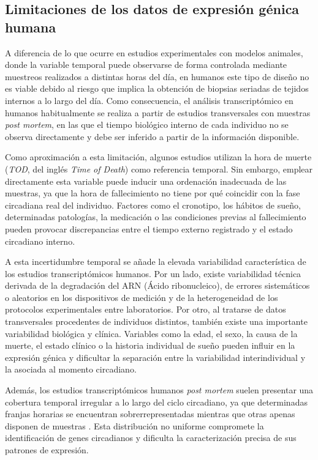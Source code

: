 \documentclass[12pt, a4paper]{report}
\begin{document}
\subsection{Limitaciones de los datos de expresión génica humana}

A diferencia de lo que ocurre en estudios experimentales con modelos animales, donde la variable temporal puede observarse de forma controlada mediante muestreos realizados a distintas horas del día, en humanos este tipo de diseño no es viable debido al riesgo que implica la obtención de biopsias seriadas de tejidos internos a lo largo del día. Como consecuencia, el análisis transcriptómico en humanos habitualmente se realiza a partir de estudios transversales con muestras \textit{post mortem}, en las que el tiempo biológico interno de cada individuo no se observa directamente y debe ser inferido a partir de la información disponible.

Como aproximación a esta limitación, algunos estudios utilizan la hora de muerte (\textit{TOD}, del inglés \textit{Time of Death}) como referencia temporal. Sin embargo, emplear directamente esta variable puede inducir una ordenación inadecuada de las muestras, ya que la hora de fallecimiento no tiene por qué coincidir con la fase circadiana real del individuo. Factores como el cronotipo, los hábitos de sueño, determinadas patologías, la medicación o las condiciones previas al fallecimiento pueden provocar discrepancias entre el tiempo externo registrado y el estado circadiano interno.

A esta incertidumbre temporal se añade la elevada variabilidad característica de los estudios transcriptómicos humanos. Por un lado, existe variabilidad técnica derivada de la degradación del ARN (Ácido ribonucleico), de errores sistemáticos o aleatorios en los dispositivos de medición y de la heterogeneidad de los protocolos experimentales entre laboratorios. Por otro, al tratarse de datos transversales procedentes de individuos distintos, también existe una importante variabilidad biológica y clínica. Variables como la edad, el sexo, la causa de la muerte, el estado clínico o la historia individual de sueño pueden influir en la expresión génica y dificultar la separación entre la variabilidad interindividual y la asociada al momento circadiano.

Además, los estudios transcriptómicos humanos \textit{post mortem} suelen presentar una cobertura temporal irregular a lo largo del ciclo circadiano, ya que determinadas franjas horarias se encuentran sobrerrepresentadas mientras que otras apenas disponen de muestras \cite{kimura2023, gorczyca2025}. Esta distribución no uniforme compromete la identificación de genes circadianos y dificulta la caracterización precisa de sus patrones de expresión.
\end{document}
